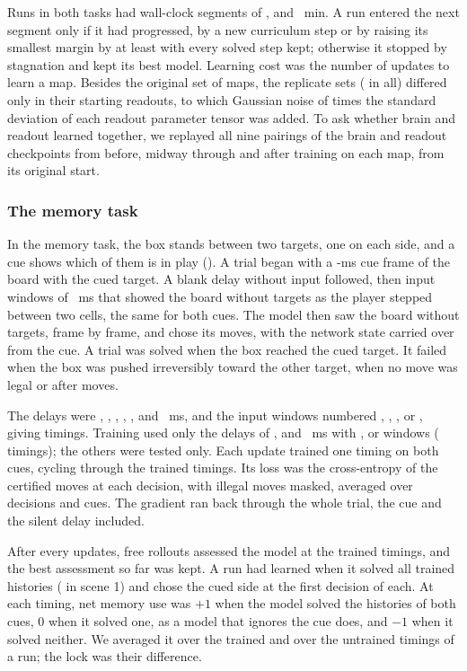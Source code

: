 Runs in both tasks had wall-clock segments of ,  and ~min. A run entered the next segment
only if it had progressed, by a new curriculum step or by raising its smallest margin by at least  with every solved
step kept; otherwise it stopped by stagnation and kept its best model. Learning cost was the number of updates to learn a
map. Besides the original set of maps, the replicate sets ( in all) differed only in their starting readouts, to which
Gaussian noise of  times the standard deviation of each readout parameter tensor was added. To ask whether brain and readout learned together, we replayed all nine pairings of the brain and
readout checkpoints from before, midway through and after training on each map, from its original start.

\subsubsection{The memory task}

In the memory task, the box stands between two targets, one on each side, and a cue shows which of them is in play
(). A trial began with a -ms cue frame of the board with the cued target. A blank delay without input
followed, then input windows of ~ms that showed the board without targets as the player stepped between two cells,
the same for both cues. The model then saw the board without targets, frame by frame, and chose its moves, with the network
state carried over from the cue. A trial was solved when the box reached the cued target. It failed when the box was pushed
irreversibly toward the other target, when no move was legal or after  moves.

The delays were , , , , ,  and ~ms, and the input
windows numbered , , ,  or , giving  timings. Training used only
the delays of ,  and ~ms with ,  or  windows (
timings); the others were tested only. Each update trained one timing on both cues, cycling through the trained timings. Its
loss was the cross-entropy of the certified moves at each decision, with illegal moves masked, averaged over decisions and
cues. The gradient ran back through the whole trial, the cue and the silent delay included.

After every  updates, free rollouts assessed the model at the trained timings, and the best assessment so far was
kept. A run had learned when it solved all trained histories ( in scene 1) and chose the cued side at the first decision
of each. At each timing, net memory use was $+1$ when the model solved the histories of both cues, 0 when it solved
one, as a model that ignores the cue does, and $-1$ when it solved neither. We averaged it over the trained and over the
untrained timings of a run; the lock was their difference.


